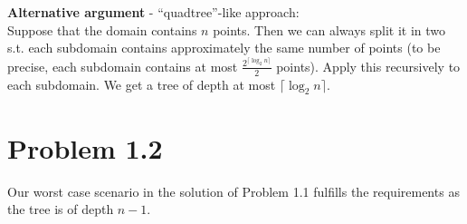 \textbf{Alternative argument} - ``quadtree''-like approach:\\
Suppose that the domain contains $n$ points. Then we can always split it in two s.t. each subdomain contains approximately the same number of points (to be precise, each subdomain contains at most $\frac{2^{\lceil\log_2n\rceil}}{2}$ points). Apply this recursively to each subdomain. We get a tree of depth at most $\lceil\log_2n\rceil$.

\section*{Problem 1.2}
Our worst case scenario in the solution of Problem 1.1 fulfills the requirements as the tree is of depth $n-1$.
